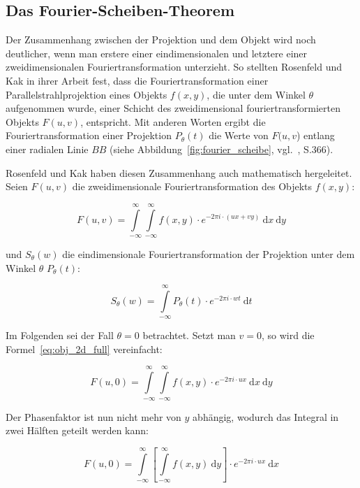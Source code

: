 \subsection{Das Fourier-Scheiben-Theorem}\label{sssec:fourier_scheibe}

Der Zusammenhang zwischen der Projektion und dem Objekt wird noch deutlicher, wenn man erstere einer eindimensionalen
und letztere einer zweidimensionalen Fouriertransformation unterzieht. So stellten Rosenfeld und Kak in ihrer Arbeit
fest, dass die Fouriertransformation einer Parallelstrahlprojektion eines Objekts $f(x, y)$, die unter dem Winkel
$\theta$ aufgenommen wurde, einer Schicht des zweidimensional fouriertransformierten Objekts $F(u, v)$, entspricht. Mit
anderen Worten ergibt die Fouriertransformation einer Projektion $P_{\theta}(t)$ die Werte von $F(u, v$) entlang einer
radialen Linie $BB$ (siehe Abbildung~\ref{fig:fourier_scheibe}, vgl.~\cite{rosenkak}, S.366).

Rosenfeld und Kak haben diesen Zusammenhang auch mathematisch hergeleitet. Seien $F(u, v)$ die zweidimensionale
Fouriertransformation des Objekts $f(x, y)$:

\begin{equation}\label{eq:obj_2d_full}
    F(u, v) = \int\limits_{-\infty}^{\infty} \int\limits_{-\infty}^{\infty} f(x, y) \cdot e^{-2 \pi i \cdot(u x + v y)}\
        \mathrm{d} x\ \mathrm{d} y
\end{equation}

und $S_{\theta}(w)$ die eindimensionale Fouriertransformation der Projektion unter dem Winkel $\theta$ $P_{\theta}(t)$:

\begin{equation}\label{eq:proj_fft}
    S_{\theta}(w) = \int\limits_{-\infty}^{\infty} P_{\theta}(t) \cdot e^{-2 \pi i \cdot w t}\ \mathrm{d} t
\end{equation}

Im Folgenden sei der Fall $\theta = 0$ betrachtet. Setzt man $v = 0$, so wird die Formel~\ref{eq:obj_2d_full}
vereinfacht:

\begin{equation}
    F(u, 0) = \int\limits_{-\infty}^{\infty} \int\limits_{-\infty}^{\infty} f(x, y) \cdot e^{-2 \pi i \cdot u x}\
    \mathrm{d} x\ \mathrm{d} y
\end{equation}

Der Phasenfaktor ist nun nicht mehr von $y$ abhängig, wodurch das Integral in zwei Hälften geteilt werden kann:

\begin{equation}\label{eq:obj_2d_split}
    F(u, 0) = \int\limits_{-\infty}^{\infty} \left[\int\limits_{-\infty}^{\infty} f(x, y)\ \mathrm{d} y \right] \cdot
    e^{-2 \pi i \cdot u x}\ \mathrm{d} x
\end{equation}

